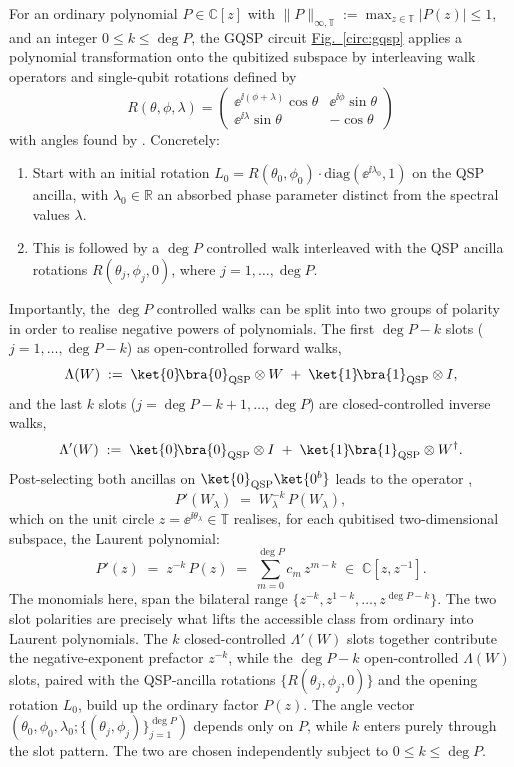 For an ordinary polynomial $P \in \mathbb{C}[z]$ with $\|P\|_{\infty,\mathbb{T}} := \max_{z\in\mathbb{T}}|P(z)| \leq 1$, and an integer $0 \leq k \leq \deg P$, the GQSP circuit \hyperref[circ:gqsp]{Fig.~\ref*{circ:gqsp}} applies a polynomial transformation onto the qubitized subspace by interleaving walk operators and single-qubit rotations defined by 
$$                      
  R(\theta, \phi, \lambda) = \begin{pmatrix} \ee^{\ii(\phi+\lambda)}\cos\theta &
  \ee^{\ii\phi}\sin\theta \\ \ee^{\ii\lambda}\sin\theta & -\cos\theta \end{pmatrix}                  
$$
with angles found by \cite[Alg. 1]{motlagh2024generalized}. Concretely:
\begin{enumerate}
    \item Start with an initial rotation $L_0 = R(\theta_0,\phi_0)\cdot\mathrm{diag}(\ee^{\ii\lambda_0}, 1)$ on the QSP ancilla, with $\lambda_0\in \mathbb{R}$ an absorbed phase parameter distinct from the spectral values $\lambda$.
    \item This is followed by a $\deg P$ controlled walk interleaved with the QSP ancilla rotations $R(\theta_j, \phi_j, 0)$, where $j = 1, \ldots, \deg P$.
\end{enumerate}
Importantly, the $\deg P$ controlled walks can be split into two groups of polarity in order to realise negative powers of polynomials. The first $\deg P - k$ slots ($j = 1, \ldots, \deg P - k$) as open-controlled forward walks, 
$$
\Lambda(W) \;:=\; \ket{0}\!\bra{0}_{\mathrm{QSP}}\otimes W \;+\; \ket{1}\!\bra{1}_{\mathrm{QSP}}\otimes I,
$$
and the last $k$ slots ($j = \deg P - k + 1, \ldots, \deg P$) are closed-controlled inverse walks, 
$$
\Lambda'(W) \;:=\; \ket{0}\!\bra{0}_{\mathrm{QSP}}\otimes I \;+\; \ket{1}\!\bra{1}_{\mathrm{QSP}}\otimes W^\dagger.
$$
Post-selecting both ancillas on $\ket{0}_{\mathrm{QSP}}\ket{0^b}$  leads to the operator \cite[Thm. 6]{motlagh2024generalized}, 
\begin{equation} \label{eq:qsp-poly}
    P'(W_\lambda) \;=\; W_\lambda^{-k}\,P(W_\lambda),
\end{equation}
which on the unit circle $z = \ee^{\ii\theta_\lambda} \in \mathbb{T}$  realises, for each qubitised two-dimensional subspace, the Laurent polynomial:
$$
P'(z) \;=\; z^{-k}\,P(z) \;=\; \sum_{m=0}^{\deg P} c_m\,z^{m - k} \;\in\; \mathbb{C}[z, z^{-1}].
$$
The monomials here, span the bilateral range $\{z^{-k}, z^{1-k}, \ldots, z^{\deg P - k}\}$. The two slot polarities are precisely what lifts the accessible class from ordinary into Laurent polynomials. The $k$ closed-controlled $\Lambda'(W)$ slots together contribute the negative-exponent prefactor $z^{-k}$, while the $\deg P - k$ open-controlled $\Lambda(W)$ slots, paired with the QSP-ancilla rotations $\{R(\theta_j,\phi_j,0)\}$ and the opening rotation $L_0$, build up the ordinary factor $P(z)$. The angle vector $(\theta_0, \phi_0, \lambda_0; \{(\theta_j, \phi_j)\}_{j=1}^{\deg P})$ depends only on $P$, while $k$ enters purely through the slot pattern. The two are chosen independently subject to $0 \leq k \leq \deg P$.

